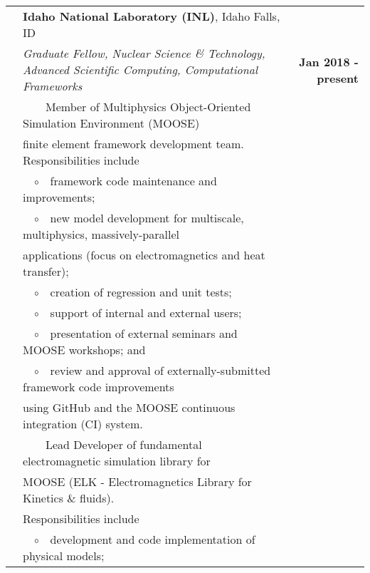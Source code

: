 \documentclass{article}
\newcommand{\tabitem}{~~\textbullet~~}
\newcommand{\tabitemii}{~~$\circ$~~}
\begin{document}
\begin{tabularx}{\textwidth}{l X r}
	\hspace{2em} & \textbf{Idaho National Laboratory (INL)}, Idaho Falls, ID & \\
	& \textit{Graduate Fellow, Nuclear Science \& Technology, Advanced Scientific Computing, Computational Frameworks} & \textbf{Jan 2018 - present} \\
	& \tabitem Member of Multiphysics Object-Oriented Simulation Environment (MOOSE) & \\
	& \hspace{1.5em} finite element framework development team. Responsibilities include & \\
		& \hspace{1.5em} \tabitemii framework code maintenance and improvements; & \\
		& \hspace{1.5em} \tabitemii new model development for multiscale, multiphysics, massively-parallel & \\
		& \hspace{3.4em} applications (focus on electromagnetics and heat transfer); & \\
		& \hspace{1.5em} \tabitemii creation of regression and unit tests; & \\
		& \hspace{1.5em} \tabitemii support of internal and external users; & \\
		& \hspace{1.5em} \tabitemii presentation of external seminars and MOOSE workshops; and & \\
		& \hspace{1.5em} \tabitemii review and approval of externally-submitted framework code improvements & \\
		& \hspace{3.4em}  using GitHub and the MOOSE continuous integration (CI) system. & \\
	& \tabitem Lead Developer of fundamental electromagnetic simulation library for & \\
	& \hspace{1.5em} MOOSE (ELK - Electromagnetics Library for Kinetics \& fluids). & \\
	& \hspace{1.5em} Responsibilities include & \\
		& \hspace{1.5em} \tabitemii development and code implementation of physical models; & \\

\end{tabularx}
\end{document}
